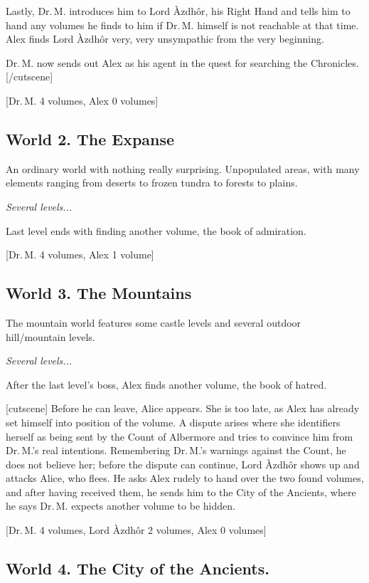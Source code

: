 \documentclass{gd-document}
\newcommand\DrM{Dr.\,M.\xspace}
\newcommand\Azdhor{Lord Àzdhôr\xspace}
\newcommand\level[1]{\textit{#1}}
\begin{document}
Lastly, \DrM introduces him to \Azdhor, his Right Hand and tells him
to hand any volumes he finds to him if \DrM himself is not reachable
at that time. Alex finds \Azdhor very, very unsympathic from the very
beginning.

\DrM now sends out Alex as his agent in the quest for searching the
Chronicles.
[/cutscene]

[\DrM 4 volumes, Alex 0 volumes]

\subsection{World 2. The Expanse}

An ordinary world with nothing really surprising. Unpopulated areas,
with many elements ranging from deserts to frozen tundra to forests to
plains.

\level{Several levels...}

Last level ends with finding another volume, the book of admiration.

[\DrM 4 volumes, Alex 1 volume]

\subsection{World 3. The Mountains}

The mountain world features some castle levels and several outdoor
hill/mountain levels.

\level{Several levels...}

After the last level’s boss, Alex finds another volume, the book of hatred.

[cutscene]
Before he can leave, Alice appears. She is too late, as Alex has
already set himself into position of the volume. A dispute arises
where she identifiers herself as being sent by the Count of Albermore
and tries to convince him from \DrM{}’s real intentions. Remembering
\DrM{}’s warnings against the Count, he does not believe her; before the
dispute can continue, \Azdhor shows up and attacks Alice, who flees. He
asks Alex rudely to hand over the two found volumes, and after having
received them, he sends him to the City of the Ancients, where he says
\DrM expects another volume to be hidden.

[\DrM 4 volumes, \Azdhor 2 volumes, Alex 0 volumes]

\subsection{World 4. The City of the Ancients.}
\end{document}
